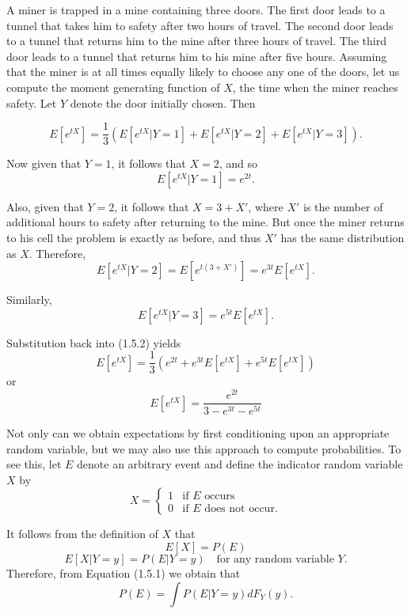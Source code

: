 \documentclass[lang=cn,10pt,thmcnt=section]{elegantbook}
\begin{document}
\begin{example}
	A miner is trapped in a mine containing three doors. The first door leads to a tunnel that takes him to safety after two hours of travel. The second door leads to a tunnel that returns him to the mine after three hours of travel. The third door leads to a tunnel that returns him to his mine after five hours. Assuming that the miner is at all times equally likely to choose any one of the doors, let us compute the moment generating function of $X$, the time when the miner reaches safety. Let $Y$ denote the door initially chosen. Then

\begin{equation}
E[e^{tX}] = \frac{1}{3}(E[e^{tX} | Y = 1] + E[e^{tX} | Y = 2] + E[e^{tX} | Y = 3]).
\end{equation}

Now given that $Y = 1$, it follows that $X = 2$, and so
\[
E[e^{tX} | Y = 1] = e^{2t}.
\]

Also, given that $Y = 2$, it follows that $X = 3 + X'$, where $X'$ is the number of additional hours to safety after returning to the mine. But once the miner returns to his cell the problem is exactly as before, and thus $X'$ has the same distribution as $X$. Therefore,
\[
E[e^{tX} | Y = 2] = E[e^{t(3 + X')}] = e^{3t} E[e^{tX}].
\]

Similarly,
\[
E[e^{tX} | Y = 3] = e^{5t} E[e^{tX}].
\]

Substitution back into (1.5.2) yields
\begin{equation}
E[e^{tX}] = \frac{1}{3}(e^{2t} + e^{3t}E[e^{tX}] + e^{5t}E[e^{tX}])
\end{equation}
or
\[
E[e^{tX}] = \frac{e^{2t}}{3 - e^{3t} - e^{5t}}
\]

Not only can we obtain expectations by first conditioning upon an appropriate random variable, but we may also use this approach to compute probabilities. To see this, let $E$ denote an arbitrary event and define the indicator random variable $X$ by
\[
X = \begin{cases}
1 & \text{if } E \text{ occurs} \\
0 & \text{if } E \text{ does not occur}.
\end{cases}
\]

It follows from the definition of $X$ that
\[
E[X] = P(E)
\]
\[
E[X | Y = y] = P(E | Y = y) \quad \text{for any random variable } Y.
\]
Therefore, from Equation (1.5.1) we obtain that
\[
P(E) = \int P(E | Y = y) dF_Y(y).
\]
\end{example}
\end{document}
